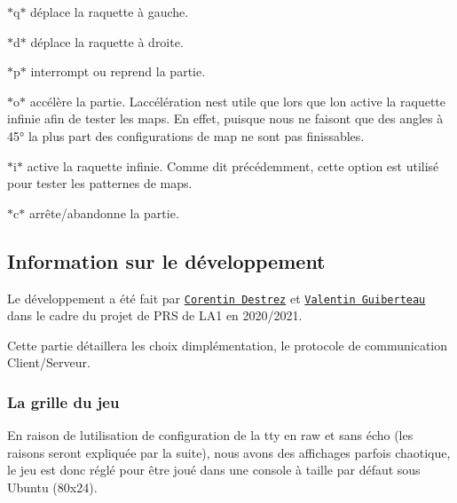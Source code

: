 \begin{DoxyItemize}
\item $\ast$\textquotesingle{}q\textquotesingle{}$\ast$ déplace la raquette à gauche.
\item $\ast$\textquotesingle{}d\textquotesingle{}$\ast$ déplace la raquette à droite.
\item $\ast$\textquotesingle{}p\textquotesingle{}$\ast$ interrompt ou reprend la partie.
\item $\ast$\textquotesingle{}o\textquotesingle{}$\ast$ accélère la partie. L\textquotesingle{}accélération n\textquotesingle{}est utile que lors que l\textquotesingle{}on active la raquette infinie afin de tester les maps. En effet, puisque nous ne faisont que des angles à 45° la plus part des configurations de map ne sont pas finissables.
\item $\ast$\textquotesingle{}i\textquotesingle{}$\ast$ active la raquette infinie. Comme dit précédemment, cette option est utilisé pour tester les patternes de maps.
\item $\ast$\textquotesingle{}c\textquotesingle{}$\ast$ arrête/abandonne la partie.
\end{DoxyItemize}

\subsection*{Information sur le développement}

Le développement a été fait par \href{https://github.com/Lafie-rage}{\tt Corentin Destrez} et \href{https://github.com/ValentinIG2I}{\tt Valentin Guiberteau} dans le cadre du projet de P\+RS de L\+A1 en 2020/2021.

Cette partie détaillera les choix d\textquotesingle{}implémentation, le protocole de communication Client/\+Serveur.

\subsubsection*{La grille du jeu}

En raison de l\textquotesingle{}utilisation de configuration de la tty en raw et sans écho (les raisons seront expliquée par la suite), nous avons des affichages parfois chaotique, le jeu est donc réglé pour être joué dans une console à taille par défaut sous Ubuntu (80x24).


